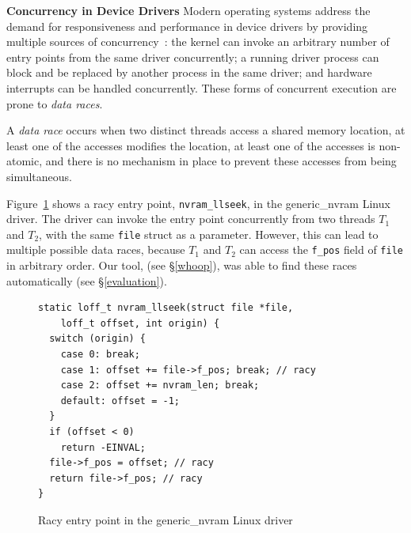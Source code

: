 \noindent\textbf{Concurrency in Device Drivers }
%
Modern operating systems address the demand for responsiveness and performance in device drivers by providing multiple sources of concurrency~\cite{corbet2005linux}: the kernel can invoke an arbitrary number of entry points from the same driver concurrently; a running driver process can block and be replaced by another process in the same driver; and hardware interrupts can be handled concurrently.  These forms of concurrent execution are prone to \emph{data races}.

\begin{definition}
\label{definition:datarace}
A \emph{data race} occurs when two distinct threads access a shared memory location, at least one of the accesses modifies the location, at least one of the accesses is non-atomic, and there is no mechanism in place to prevent these accesses from being simultaneous.
\end{definition}

Figure~\ref{fig:data_race_example} shows a racy entry point, \texttt{nvram\_llseek}, in the generic\_nvram Linux driver. The driver can invoke the entry point concurrently from two threads $T_1$ and $T_2$, with the same \texttt{file} struct as a parameter. However, this can lead to multiple possible data races, because $T_1$ and $T_2$ can access the \texttt{f\_pos} field of \texttt{file} in arbitrary order. Our tool, \whoop (see \S\ref{whoop}), was able to find these races automatically (see \S\ref{evaluation}).

\begin{figure}[t]
\begin{lstlisting}
static loff_t nvram_llseek(struct file *file,
    loff_t offset, int origin) {
  switch (origin) {
    case 0: break;
    case 1: offset += file->f_pos; break; // racy
    case 2: offset += nvram_len; break;
    default: offset = -1;
  }
  if (offset < 0)
    return -EINVAL;
  file->f_pos = offset; // racy
  return file->f_pos; // racy
}
\end{lstlisting}
\vspace{-2mm}
\caption{Racy entry point in the generic\_nvram Linux driver}
\label{fig:data_race_example}
\vspace{-2mm}
\end{figure}

